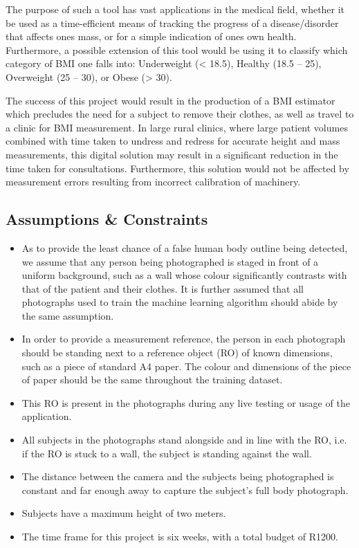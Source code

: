 \documentclass[conference]{IEEEtran}
\begin{document}
The purpose of such a tool has vast applications in the medical field, whether it be used as a time-efficient means of tracking the progress of a disease/disorder that affects ones mass, or for a simple indication of ones own health.
Furthermore, a possible extension of this tool would be using it to classify which category of BMI one falls into: Underweight (< 18.5), Healthy (18.5 -- 25), Overweight (25 -- 30), or Obese (> 30).

The success of this project would result in the production of a BMI estimator which precludes the need for a subject to remove their clothes, as well as travel to a clinic for BMI measurement.
In large rural clinics, where large patient volumes combined with time taken to undress and redress for accurate height and mass measurements, this digital solution may result in a significant reduction in the time taken for consultations.
Furthermore, this solution would not be affected by measurement errors resulting from incorrect calibration of machinery.

\subsection{Assumptions \& Constraints}
\begin{itemize}
	\item As to provide the least chance of a false human body outline being detected, we assume that any person being photographed is staged in front of a uniform background, such as a wall whose colour significantly contrasts with that of the patient and their clothes.
	It is further assumed that all photographs used to train the machine learning algorithm should abide by the same assumption.
	\item In order to provide a measurement reference, the person in each photograph should be standing next to a reference object (RO) of known dimensions, such as a piece of standard A4 paper. The colour and dimensions of the piece of paper should be the same throughout the training dataset.
	\item This RO is present in the photographs during any live testing or usage of the application.
	\item All subjects in the photographs stand alongside and in line with the RO, i.e. if the RO is stuck to a wall, the subject is standing against the wall.
	\item The distance between the camera and the subjects being photographed is constant and far enough away to capture the subject's full body photograph.
	\item Subjects have a maximum height of two meters.
	\item The time frame for this project is six weeks, with a total budget of R1200.
\end{itemize}
\end{document}
